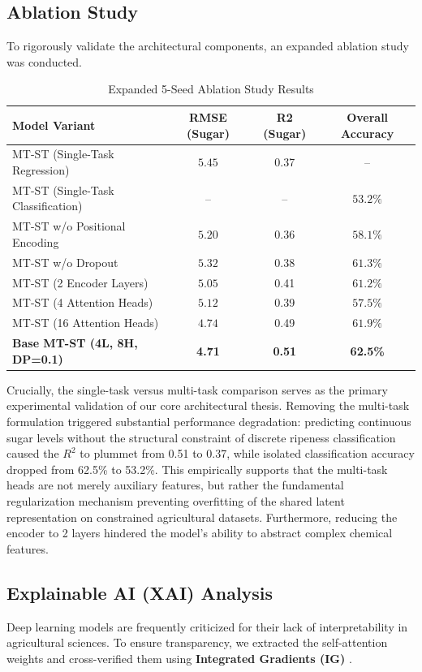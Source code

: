 \documentclass[pdflatex,sn-mathphys-num]{sn-jnl}
\begin{document}
\subsection{Ablation Study}
To rigorously validate the architectural components, an expanded ablation study was conducted.

\begin{table}[ht]
\centering
\caption{Expanded 5-Seed Ablation Study Results}\label{tab:ablation}
\begin{tabular}{@{}lccc@{}}
\toprule
\textbf{Model Variant} & \textbf{RMSE (Sugar)} & \textbf{R2 (Sugar)} & \textbf{Overall Accuracy} \\
\midrule
MT-ST (Single-Task Regression) & $5.45$ & 0.37 & -- \\
MT-ST (Single-Task Classification) & -- & -- & $53.2\%$ \\
MT-ST w/o Positional Encoding & $5.20$ & 0.36 & $58.1\%$ \\
MT-ST w/o Dropout & $5.32$ & 0.38 & $61.3\%$ \\
MT-ST (2 Encoder Layers) & $5.05$ & 0.41 & $61.2\%$ \\
MT-ST (4 Attention Heads) & $5.12$ & 0.39 & $57.5\%$ \\
MT-ST (16 Attention Heads) & $4.74$ & 0.49 & $61.9\%$ \\
\textbf{Base MT-ST (4L, 8H, DP=0.1)} & \textbf{4.71} & \textbf{0.51} & \textbf{62.5\%} \\
\bottomrule
\end{tabular}
\end{table}

Crucially, the single-task versus multi-task comparison serves as the primary experimental validation of our core architectural thesis. Removing the multi-task formulation triggered substantial performance degradation: predicting continuous sugar levels without the structural constraint of discrete ripeness classification caused the $R^2$ to plummet from 0.51 to 0.37, while isolated classification accuracy dropped from 62.5\% to 53.2\%. This empirically supports that the multi-task heads are not merely auxiliary features, but rather the fundamental regularization mechanism preventing overfitting of the shared latent representation on constrained agricultural datasets. Furthermore, reducing the encoder to 2 layers hindered the model's ability to abstract complex chemical features.

\subsection{Explainable AI (XAI) Analysis}
Deep learning models are frequently criticized for their lack of interpretability in agricultural sciences. To ensure transparency, we extracted the self-attention weights and cross-verified them using \textbf{Integrated Gradients (IG)} \cite{sundararajan2017axiomatic}.
\end{document}
